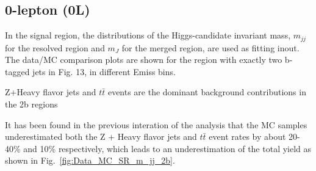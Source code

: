 \subsection{0-lepton (0L)}

\par In the signal region, the distributions of the Higgs-candidate invariant mass, $m_{jj}$ for the
 resolved region and $m_J$ for the merged region, are used as fitting inout. The data/MC comparison plots are shown for the region
 with exactly two b-tagged jets in Fig. 13, in different Emiss bins. 
 \par Z+Heavy flavor jets and $t\bar{t}$ events are the dominant background contributions in the 2b regions
\par It has been found in the previous interation of the analysis that the MC samples underestimated both the Z + Heavy flavor jets and
$t\bar{t}$ event rates by about 20-40\% and 10\% respectively, which leads to an underestimation of the total yield as shown in Fig.~\ref{fig:Data_MC_SR_m_jj_2b}.


